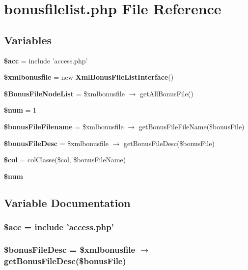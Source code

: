 \section{bonusfilelist.php File Reference}
\label{bonusfilelist_8php}


\subsection*{Variables}
\begin{CompactItemize}
\item 
{\bf \$acc} = include 'access.php'
\item 
{\bf \$xmlbonusfile} = new {\bf Xml\-Bonus\-File\-List\-Interface}()
\item 
{\bf \$Bonus\-File\-Node\-List} = \$xmlbonusfile $\rightarrow$ get\-All\-Bonus\-File()
\item 
{\bf \$num} = 1
\item 
{\bf \$bonus\-File\-Filename} = \$xmlbonusfile $\rightarrow$ get\-Bonus\-File\-File\-Name(\$bonus\-File)
\item 
{\bf \$bonus\-File\-Desc} = \$xmlbonusfile $\rightarrow$ get\-Bonus\-File\-Desc(\$bonus\-File)
\item 
{\bf \$col} = col\-Classe(\$col, \$bonus\-File\-Name)
\item 
{\bf \$num}
\end{CompactItemize}


\subsection{Variable Documentation}
\subsubsection{\setlength{\rightskip}{0pt plus 5cm}\$acc = include 'access.php'}\label{bonusfilelist_8php_542926c588a05eb69553d79c83cf73da}


\subsubsection{\setlength{\rightskip}{0pt plus 5cm}\$bonus\-File\-Desc = \$xmlbonusfile $\rightarrow$ get\-Bonus\-File\-Desc(\$bonus\-File)}\label{bonusfilelist_8php_9ed07d0ad4c0f35b6978c428b4cffe0e}


